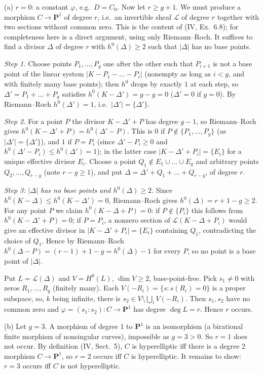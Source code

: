 \documentclass[11pt]{article}
\begin{document}
(a) $r=0$: a constant $\varphi$, e.g.\ $D=C_0$. Now let $r\ge g+1$. We must produce a morphism $C\to\mathbf P^1$ of degree $r$, i.e.\ an invertible sheaf $\mathcal L$ of degree $r$ together with two sections without common zero. This is the content of (IV, Ex.~6.8); for completeness here is a direct argument, using only Riemann--Roch. It suffices to find a divisor $\Delta$ of degree $r$ with $h^0(\Delta)\ge2$ such that $|\Delta|$ has no base points.

\emph{Step 1.} Choose points $P_1,\dots,P_g$ one after the other such that $P_{i+1}$ is not a base point of the linear system $|K-P_1-\dots-P_i|$ (nonempty as long as $i<g$, and with finitely many base points); then $h^0$ drops by exactly $1$ at each step, so $\Delta'=P_1+\dots+P_g$ satisfies $h^0(K-\Delta')=g-g=0$ ($\Delta'=0$ if $g=0$). By Riemann--Roch $h^0(\Delta')=1$, i.e.\ $|\Delta'|=\{\Delta'\}$.

\emph{Step 2.} For a point $P$ the divisor $K-\Delta'+P$ has degree $g-1$, so Riemann--Roch gives $h^0(K-\Delta'+P)=h^0(\Delta'-P)$. This is $0$ if $P\notin\{P_1,\dots,P_g\}$ (as $|\Delta'|=\{\Delta'\}$), and $1$ if $P=P_i$ (since $\Delta'-P_i\ge0$ and $h^0(\Delta'-P_i)\le h^0(\Delta')=1$); in the latter case $|K-\Delta'+P_i|=\{E_i\}$ for a unique effective divisor $E_i$. Choose a point $Q_1\notin E_1\cup\dots\cup E_g$ and arbitrary points $Q_2,\dots,Q_{r-g}$ (note $r-g\ge1$), and put $\Delta=\Delta'+Q_1+\dots+Q_{r-g}$, of degree $r$.

\emph{Step 3: $|\Delta|$ has no base points and $h^0(\Delta)\ge2$.} Since $h^0(K-\Delta)\le h^0(K-\Delta')=0$, Riemann--Roch gives $h^0(\Delta)=r+1-g\ge2$. For any point $P$ we claim $h^0(K-\Delta+P)=0$: if $P\notin\{P_i\}$ this follows from $h^0(K-\Delta'+P)=0$; if $P=P_i$, a nonzero section of $\mathcal L(K-\Delta+P_i)$ would give an effective divisor in $|K-\Delta'+P_i|=\{E_i\}$ containing $Q_1$, contradicting the choice of $Q_1$. Hence by Riemann--Roch $h^0(\Delta-P)=(r-1)+1-g=h^0(\Delta)-1$ for every $P$, so no point is a base point of $|\Delta|$.

Put $L=\mathcal L(\Delta)$ and $V=H^0(L)$, $\dim V\ge2$, base-point-free. Pick $s_1\ne0$ with zeros $R_1,\dots,R_q$ (finitely many). Each $V(-R_i)=\{s: s(R_i)=0\}$ is a proper subspace, so, $k$ being infinite, there is $s_2\in V\setminus\bigcup_iV(-R_i)$. Then $s_1,s_2$ have no common zero and $\varphi=(s_1:s_2)\colon C\to\mathbf P^1$ has degree $\deg L=r$. Hence $r$ occurs.

(b) Let $g=3$. A morphism of degree 1 to $\mathbf P^1$ is an isomorphism (a birational finite morphism of nonsingular curves), impossible as $g=3>0$. So $r=1$ does not occur. By definition (IV, Sect.~5), $C$ is hyperelliptic iff there is a degree 2 morphism $C\to\mathbf P^1$, so $r=2$ occurs iff $C$ is hyperelliptic. It remains to show: $r=3$ occurs iff $C$ is not hyperelliptic.
\end{document}

